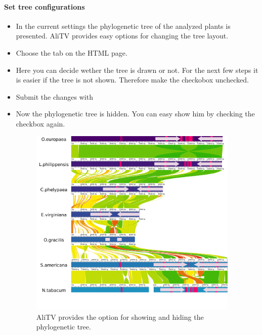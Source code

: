 \documentclass[a4paper]{scrartcl}
\begin{document}
\paragraph*{Set tree configurations}
\begin{itemize}
	\item In the current settings the phylogenetic tree of the analyzed plants is presented. AliTV provides easy options for changing the tree layout.
	\item Choose the tab  on the HTML page.
	\item Here you can decide wether the tree is drawn or not. For the next few steps it is easier if the tree is not shown. Therefore make the checkobox unchecked.
	\item Submit the changes with 
	\item Now the phylogenetic tree is hidden. You can easy show him by checking the checkbox again.
	\begin{figure}[H]
		\centering
		\includegraphics[width=10cm]{noTree.png}
		\caption{AliTV provides the option for showing and hiding the phylogenetic tree.}
	\end{figure}
\end{itemize}
\end{document}
